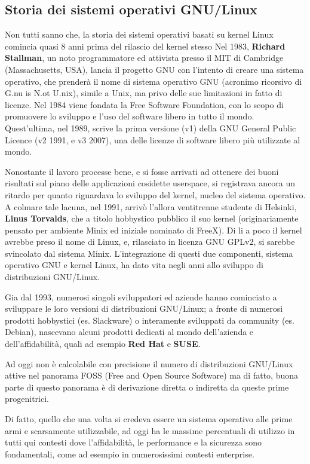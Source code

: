 \subsection{Storia dei sistemi operativi GNU/Linux}

Non tutti sanno che, la storia dei sistemi operativi basati su kernel Linux comincia quasi 8 anni prima del rilascio del kernel stesso Nel 1983, \textbf{Richard Stallman}, un noto programmatore ed attivista presso il MIT di Cambridge (Massachusetts, USA), lancia il progetto GNU con l'intento di creare una sistema operativo, che prenderà il nome di sistema operativo GNU (acronimo ricorsivo di G.nu is N.ot U.nix), simile a Unix, ma privo delle sue limitazioni in fatto di licenze. Nel 1984 viene fondata la Free Software Foundation, con lo scopo di promuovere lo sviluppo e l'uso del software libero in tutto il mondo. Quest'ultima, nel 1989, scrive la prima versione (v1) della GNU General Public Licence (v2 1991, e v3 2007), una delle licenze di software libero più utilizzate al mondo.

Nonostante il lavoro processe bene, e si fosse arrivati ad ottenere dei buoni risultati sul piano delle applicazioni cosidette userspace, si registrava ancora un ritardo per quanto riguardava lo sviluppo del kernel, nucleo del sistema operativo. A colmare tale lacuna, nel 1991, arrivò l'allora ventitrenne studente di Helsinki, \textbf{Linus Torvalds}, che a titolo hobbystico pubblico il suo kernel (originariamente pensato per ambiente Minix ed iniziale nominato di FreeX). Di li a poco il kernel avrebbe preso il nome di Linux, e, rilasciato in licenza GNU GPLv2, si sarebbe svincolato dal sistema Minix. L'integrazione di questi due componenti, sistema operativo GNU e kernel Linux, ha dato vita negli anni allo sviluppo di distribuzioni GNU/Linux. 

Gia dal 1993, numerosi singoli sviluppatori ed aziende hanno cominciato a sviluppare le loro versioni di distribuzioni GNU/Linux; a fronte di numerosi prodotti hobbystici (es. Slackware) o interamente sviluppati da community (es. Debian), nascevano alcuni prodotti dedicati al mondo dell'azienda e dell'affidabilità, quali ad esempio \textbf{Red Hat} e \textbf{SUSE}.

Ad oggi non è calcolabile con precisione il numero di distribuzioni GNU/Linux attive nel panorama FOSS (Free and Open Source Software) ma di fatto, buona parte di questo panorama è di derivazione diretta o indiretta da queste prime progenitrici.

Di fatto, quello che una volta si credeva essere un sistema operativo alle prime armi e scarsamente utilizzabile, ad oggi ha le massime percentuali di utilizzo in tutti qui contesti dove l'affidabilità, le performance e la sicurezza sono fondamentali, come ad esempio in numerosissimi contesti enterprise. 

